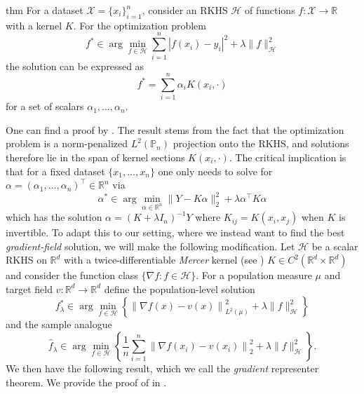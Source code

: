 \documentclass[11pt]{article}
\begin{document}
\begin{restatable}{thm}{}
    For a dataset $\mathcal{X} = \{x_i\}_{i = 1}^n$, consider an RKHS $\mathcal{H}$ of functions $f: \mathcal{X} \rightarrow \mathbb{R}$ with a kernel $K$. For the optimization problem
    \[f^* \in \arg\min_{f\in \mathcal{H}}\sum_{i = 1}^n\left|f(x_i) - y_i\right|^2 + \lambda \|f\|_\mathcal{H}^2\]
    the solution can be expressed as 
    \[f^* = \sum_{i = 1}^n\alpha_i K(x_i, \cdot )\]
    for a set of scalars $\alpha_1, \dots, \alpha_n$. 
\end{restatable}
One can find a proof by \citet{ghojogh2021reproducing}. The result stems from the fact that the optimization problem is a norm-penalized $L^2(\mathbb{P}_n)$ projection onto the RKHS, and solutions therefore lie in the span of kernel sections $K(x_i, \cdot)$. The critical implication is that for a fixed dataset $\{x_1, \dots, x_n\}$ one only needs to solve for $\alpha = (\alpha_1, \dots, \alpha_n)^{\top} \in \mathbb{R}^n$ via
\[\alpha^* \in \arg\min_{\alpha \in \mathbb{R}^n}\|Y - K\alpha\|_2^2 + \lambda\alpha^{\top}K\alpha\]
which has the solution $\alpha = (K + \lambda I_n)^{-1}Y$ where $K_{ij} = K(x_i, x_j)$ when $K$ is invertible. To adapt this to our setting, where we instead want to find the best \textit{gradient-field} solution, we will make the following modification. Let $\mathcal{H}$ be a scalar RKHS on $\mathbb{R}^d$ with a twice-differentiable \textit{Mercer} kernel (see \citet{zhou2008derivative}) $K \in C^2(\mathbb{R}^d \times \mathbb{R}^d)$ and consider the function class $\{\nabla f : f\in \mathcal{H}\}$. For a population measure $\mu$ and target field $v: \mathbb{R}^d \rightarrow \mathbb{R}^d$ define the population-level solution 
\begin{equation}
    f^*_{\lambda} \in \arg\min_{f \in \mathcal{H}}\left\{\left\|\nabla f(x) - v(x)\right\|_{L^2(\mu)}^2 + \lambda\|f\|_{\mathcal{H}}^2\right\} \label{eq: population gradient RKHS problem}
\end{equation}
and the sample analogue
\begin{equation}
    \hat{f}_{\lambda} \in \arg\min_{f \in \mathcal{H}}\left\{\frac{1}{n}\sum_{i = 1}^n\left\|\nabla f(x_i) - v(x_i)\right\|_{2}^2 + \lambda\|f\|_{\mathcal{H}}^2\right\}. \label{eq: sample gradient RKHS problem}
\end{equation}
We then have the following result, which we call the \textit{gradient} representer theorem. We provide the proof of  in .
\end{document}
